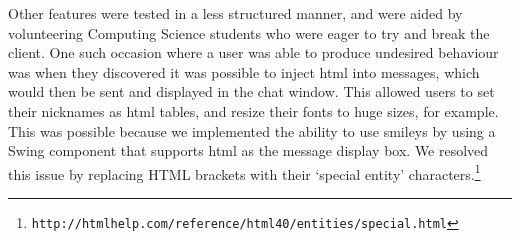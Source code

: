 Other features were tested in a less structured manner, and were aided by volunteering Computing Science students who were eager to try and break the client. One such occasion where a user was able to produce undesired behaviour was when they discovered it was possible to inject html into messages, which would then be sent and displayed in the chat window. This allowed users to set their nicknames as html tables, and resize their fonts to huge sizes, for example. This was possible because we implemented the ability to use smileys by using a Swing component that supports html as the message display box. We resolved this issue by replacing HTML brackets with their `special entity' characters.\footnote{\texttt{http://htmlhelp.com/reference/html40/entities/special.html}}


